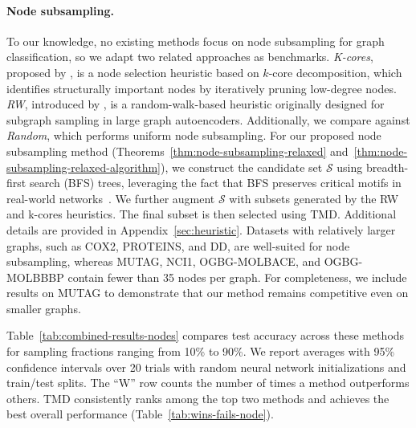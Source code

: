 \paragraph{Node subsampling.} To our knowledge, no existing methods focus on node subsampling for graph classification, so we adapt two related approaches as benchmarks. \emph{K-cores}, proposed by \citet{razin2023ability}, is a node selection heuristic based on $k$-core decomposition, which identifies structurally important nodes by iteratively pruning low-degree nodes. \emph{RW}, introduced by \citet{salha2022degeneracy}, is a random-walk-based heuristic originally designed for subgraph sampling in large graph autoencoders. Additionally, we compare against \emph{Random}, which performs uniform node subsampling.  For our proposed node subsampling method (Theorems~\ref{thm:node-subsampling-relaxed} and~\ref{thm:node-subsampling-relaxed-algorithm}), we construct the candidate set $\mathcal{S}$ using breadth-first search (BFS) trees, leveraging the fact that BFS preserves critical motifs in real-world networks~\citep{alimohammadi2023local}. We further augment $\mathcal{S}$ with subsets generated by the RW and k-cores heuristics. The final subset is then selected using TMD. Additional details are provided in Appendix~\ref{sec:heuristic}.  Datasets with relatively larger graphs, such as COX2, PROTEINS, and DD, are well-suited for node subsampling, whereas MUTAG, NCI1, OGBG-MOLBACE, and OGBG-MOLBBBP contain fewer than 35 nodes per graph. For completeness, we include results on MUTAG to demonstrate that our method remains competitive even on smaller graphs.  

Table~\ref{tab:combined-results-nodes} compares test accuracy across these methods for sampling fractions ranging from 10\% to 90\%. We report averages with 95\% confidence intervals over 20 trials with random neural network initializations and train/test splits. The ``W'' row counts the number of times a method outperforms others. TMD consistently ranks among the top two methods and achieves the best overall performance (Table~\ref{tab:wins-fails-node}).  \\


\clearpage
\newpage






